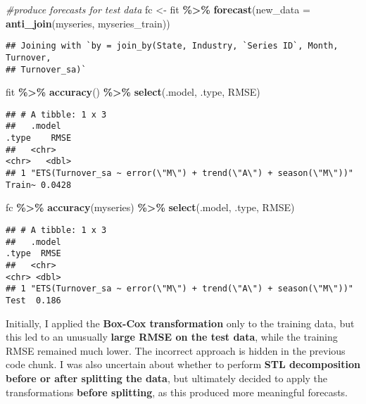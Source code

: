 \documentclass[
]{article}
\newenvironment{Shaded}{\begin{snugshade}}{\end{snugshade}}
\newcommand{\AttributeTok}[1]{\textcolor[rgb]{0.13,0.29,0.53}{#1}}
\newcommand{\CommentTok}[1]{\textcolor[rgb]{0.56,0.35,0.01}{\textit{#1}}}
\newcommand{\FunctionTok}[1]{\textcolor[rgb]{0.13,0.29,0.53}{\textbf{#1}}}
\newcommand{\NormalTok}[1]{#1}
\newcommand{\OtherTok}[1]{\textcolor[rgb]{0.56,0.35,0.01}{#1}}
\newcommand{\SpecialCharTok}[1]{\textcolor[rgb]{0.81,0.36,0.00}{\textbf{#1}}}
\begin{document}
\begin{Shaded}
\begin{Highlighting}[]
\CommentTok{\#produce forecasts for test data}
\NormalTok{fc }\OtherTok{\textless{}{-}}\NormalTok{ fit }\SpecialCharTok{\%\textgreater{}\%}
  \FunctionTok{forecast}\NormalTok{(}\AttributeTok{new\_data =} \FunctionTok{anti\_join}\NormalTok{(myseries, myseries\_train))}
\end{Highlighting}
\end{Shaded}

\begin{verbatim}
## Joining with `by = join_by(State, Industry, `Series ID`, Month, Turnover,
## Turnover_sa)`
\end{verbatim}

\begin{Shaded}
\begin{Highlighting}[]
\NormalTok{fit }\SpecialCharTok{\%\textgreater{}\%} \FunctionTok{accuracy}\NormalTok{() }\SpecialCharTok{\%\textgreater{}\%}
  \FunctionTok{select}\NormalTok{(.model, .type, RMSE)}
\end{Highlighting}
\end{Shaded}

\begin{verbatim}
## # A tibble: 1 x 3
##   .model                                                           .type    RMSE
##   <chr>                                                            <chr>   <dbl>
## 1 "ETS(Turnover_sa ~ error(\"M\") + trend(\"A\") + season(\"M\"))" Train~ 0.0428
\end{verbatim}

\begin{Shaded}
\begin{Highlighting}[]
\NormalTok{fc }\SpecialCharTok{\%\textgreater{}\%} \FunctionTok{accuracy}\NormalTok{(myseries) }\SpecialCharTok{\%\textgreater{}\%}
  \FunctionTok{select}\NormalTok{(.model, .type, RMSE)}
\end{Highlighting}
\end{Shaded}

\begin{verbatim}
## # A tibble: 1 x 3
##   .model                                                           .type  RMSE
##   <chr>                                                            <chr> <dbl>
## 1 "ETS(Turnover_sa ~ error(\"M\") + trend(\"A\") + season(\"M\"))" Test  0.186
\end{verbatim}

Initially, I applied the \textbf{Box-Cox transformation} only to the
training data, but this led to an unusually \textbf{large RMSE on the
test data}, while the training RMSE remained much lower. The incorrect
approach is hidden in the previous code chunk. I was also uncertain
about whether to perform \textbf{STL decomposition before or after
splitting the data}, but ultimately decided to apply the transformations
\textbf{before splitting}, as this produced more meaningful forecasts.
\end{document}
